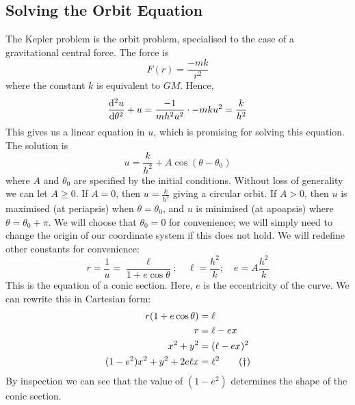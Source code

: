 \subsection{Solving the Orbit Equation}
The Kepler problem is the orbit problem, specialised to the case of a gravitational central force. The force is
\[ F(r) = \frac{-mk}{r^2} \]
where the constant \(k\) is equivalent to \(GM\). Hence,
\[ \dv[2]{u}{\theta} + u = \frac{-1}{mh^2u^2} \cdot -mku^2 = \frac{k}{h^2} \]
This gives us a linear equation in \(u\), which is promising for solving this equation. The solution is
\[ u = \frac{k}{h^2} + A\cos(\theta - \theta_0) \]
where \(A\) and \(\theta_0\) are specified by the initial conditions. Without loss of generality we can let \(A \geq 0\). If \(A = 0\), then \(u = \frac{k}{h^2}\) giving a circular orbit. If \(A > 0\), then \(u\) is maximised (at periapsis) when \(\theta = \theta_0\), and \(u\) is minimised (at apoapsis) where \(\theta = \theta_0 + \pi\). We will choose that \(\theta_0 = 0\) for convenience; we will simply need to change the origin of our coordinate system if this does not hold. We will redefine other constants for convenience:
\[ r = \frac{1}{u} = \frac{\ell}{1 + e\cos \theta};\quad \ell = \frac{h^2}{k};\quad e = A\frac{h^2}{k} \]
This is the equation of a conic section. Here, \(e\) is the eccentricity of the curve. We can rewrite this in Cartesian form:
\begin{align}
	r(1 + e\cos \theta)         & = \ell \notag            \\
	r                           & = \ell - ex \notag       \\
	x^2 + y^2                   & = (\ell - ex)^2 \notag   \\
	(1-e^2)x^2 + y^2 + 2e\ell x & = \ell^2 \tag{\(\dagger\)}
\end{align}
By inspection we can see that the value of \((1-e^2)\) determines the shape of the conic section.
